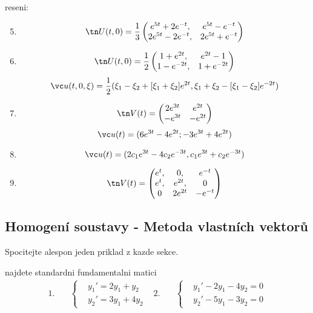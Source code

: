 \pagebreak
reseni:
\begin{enumerate}
\setcounter{enumi}{4}
\item
 \[
   \tn U(t,0)=\frac13
   \left(\begin{matrix}
      e^{5t}+2e^{-t},&e^{5t}-e^{-t}\\
      2e^{5t}-2e^{-t},&2e^{5t}+e^{-t}
   \end{matrix}\right)
 \]
 \item
 \[
 \tn U(t,0)=\frac12\left(\begin{matrix}
                     1+e^{2t},&e^{2t}-1\\
                     1-e^{-2t},&1+e^{-2t}
                   \end{matrix}\right)
 \]
 \[
   \vc u(t,0,\xi)=\frac12(\xi_1-\xi_2+[\xi_1+\xi_2]e^{2t},
      \xi_1+\xi_2-[\xi_1-\xi_2]e^{-2t})
 \]
 \item
 \[
  \tn V(t)=\left(\begin{matrix}
               2e^{3t}& e^{2t}\\
               -e^{3t}& -e^{2t}
             \end{matrix}\right) 
\]
\[
  \vc u(t)=(6e^{3t}-4e^{2t};-3e^{3t}+4e^{2t})
\]
\item
\[
  \vc u(t)=(2c_1e^{3t}-4c_2e^{-3t},c_1e^{3t}+c_2e^{-3t})
\]
\item
\[
  \tn V(t)=\left(\begin{matrix} 
     e^t,&0,&e^{-t}\\e^t,&e^{2t},&0\\0&2e^{2t}&-e^{-t}
   \end{matrix}\right)
\]
\end{enumerate}


\subsection{Homogení soustavy  - Metoda vlastních vektorů}

Spocitejte alespon jeden priklad z kazde sekce.

najdete standardni fundamentalni matici
 \begin{align*}
   1.&\quad
   \left\{
   \begin{aligned}
     &y_1'=2y_1+y_2\\
     &y_2'=3y_1+4y_2
   \end{aligned}\right.
   &
   2.&\quad
   \left\{
   \begin{aligned}
     &y_1'-2y_1-4y_2=0\\
     &y_2'-5y_1-3y_2=0
   \end{aligned}\right.
\end{align*}

